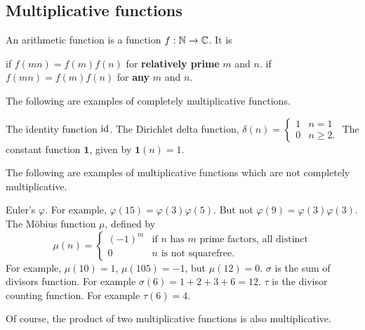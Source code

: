 \documentclass[11pt]{scrartcl}
\begin{document}
\subsection{Multiplicative functions}
\begin{definition}
	An arithmetic function is a function $f : \mathbb N \to \mathbb C$.
	It is
	\begin{itemize}
		\ii {} if $f(mn) = f(m) f(n)$
		for \textbf{relatively prime} $m$ and $n$.
		\ii {} if $f(mn) = f(m)f(n)$
		for \textbf{any} $m$ and $n$.
	\end{itemize}
\end{definition}

\begin{example}
	The following are examples of completely multiplicative functions.
	\begin{itemize}
		\ii The identity function $\mathrm{id}$.
		\ii The Dirichlet delta function, $\delta(n) = 
		\begin{cases}
			1 & n = 1 \\
			0 & n \ge 2.
		\end{cases}$
		\ii The constant function $\mathbf 1$,
		given by $\mathbf 1(n) = 1$.
	\end{itemize}
\end{example}

\begin{example}
	The following are examples of multiplicative functions
	which are not completely multiplicative.
	\begin{itemize}
		\ii Euler's $\varphi$. For example, $\varphi(15) = \varphi(3)\varphi(5)$.
		But not $\varphi(9) = \varphi(3)\varphi(3)$.
		\ii The M\"obius function $\mu$, defined by
		\[
			\mu(n)
			=
			\begin{cases}
				(-1)^m & \text{if $n$ has $m$ prime factors, all distinct} \\
				0 & \text{$n$ is not squarefree}.
			\end{cases}
		\]
		For example, $\mu(10) = 1$, $\mu(105) = -1$, but $\mu(12) = 0$.
		\ii $\sigma$ is the sum of divisors function.
		For example $\sigma(6) = 1+2+3+6 = 12$.
		\ii $\tau$ is the divisor counting function.
		For example $\tau(6) = 4$.
	\end{itemize}
\end{example}

Of course, the product of two multiplicative functions is also multiplicative.
\end{document}
